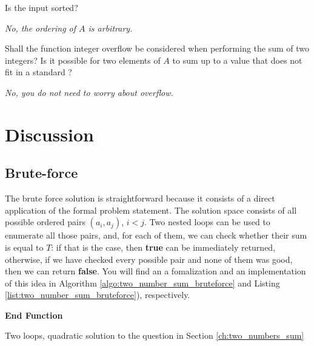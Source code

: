 \begin{QandA}
	\begin{questionitem} \begin{question} Is the input sorted?  \end{question} 	 
    \begin{answered}
		\textit{No, the ordering of $A$ is arbitrary.}
	\end{answered} \end{questionitem}
	\begin{questionitem} \begin{question} Shall the function integer overflow be considered when performing the sum of two integers? Is it possible for two elements of $A$ to sum up to a value that does not fit in a standard ?  \end{question} 	 
    \begin{answered}
		\textit{No, you do not need to worry about overflow.}
	\end{answered} \end{questionitem}
\end{QandA}


\section{Discussion}

\subsection{Brute-force}
\label{sec:two_numbers:bruteforce}

The brute force solution is straightforward because it consists of a direct application of the formal problem statement. 
The solution space consists of all possible ordered pairs $(a_i,a_j)$, $i < j$. 
Two nested loops can be used to enumerate all those pairs, and, for each of them, we can check whether their sum is equal to $T$: if that is the case,
then   \textbf{true} can be immediately returned, otherwise, if we have checked every possible pair and none of them was good, then we can return  \textbf{false}.
You will find an a fomalization and an implementation of this idea in Algorithm \ref{algo:two_number_sum_bruteforce}
and Listing \ref{list:two_number_sum_bruteforce}), respectively.

\begin{algorithm}
	\SetAlgoLined {}
	
	 

	\textbf{End Function}
	
		\caption{Two loops, quadratic solution to the question in Section \ref{ch:two_numbers_sum} }
		\label{algo:two_number_sum_bruteforce}
\end{algorithm}


